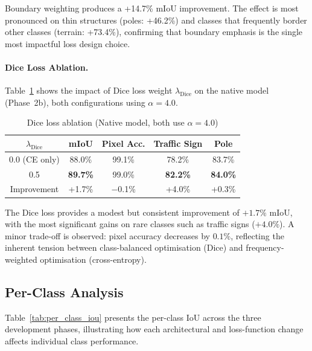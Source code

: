 Boundary weighting produces a +14.7\% mIoU improvement. The effect is most pronounced on thin structures (poles: +46.2\%) and classes that frequently border other classes (terrain: +73.4\%), confirming that boundary emphasis is the single most impactful loss design choice.

\paragraph{Dice Loss Ablation.}
Table~\ref{tab:dice_ablation} shows the impact of Dice loss weight $\lambda_{\text{Dice}}$ on the native model (Phase~2b), both configurations using $\alpha=4.0$.

\begin{table}[t]
    \centering
    \caption{Dice loss ablation (Native model, both use $\alpha=4.0$)}
    \label{tab:dice_ablation}
    \begin{tabular}{ccccc}
        \toprule
        $\lambda_{\text{Dice}}$ & \textbf{mIoU} & \textbf{Pixel Acc.} & \textbf{Traffic Sign} & \textbf{Pole} \\
        \midrule
        0.0 (CE only) & 88.0\% & 99.1\% & 78.2\% & 83.7\% \\
        0.5 & \textbf{89.7\%} & 99.0\% & \textbf{82.2\%} & \textbf{84.0\%} \\
        \midrule
        Improvement & +1.7\% & $-$0.1\% & +4.0\% & +0.3\% \\
        \bottomrule
    \end{tabular}
\end{table}

The Dice loss provides a modest but consistent improvement of $+1.7\%$ mIoU, with the most significant gains on rare classes such as traffic signs ($+4.0\%$). A minor trade-off is observed: pixel accuracy decreases by $0.1\%$, reflecting the inherent tension between class-balanced optimisation (Dice) and frequency-weighted optimisation (cross-entropy).

\subsection{Per-Class Analysis}
\label{subsec:per_class_iou}

Table~\ref{tab:per_class_iou} presents the per-class IoU across the three development phases, illustrating how each architectural and loss-function change affects individual class performance.


